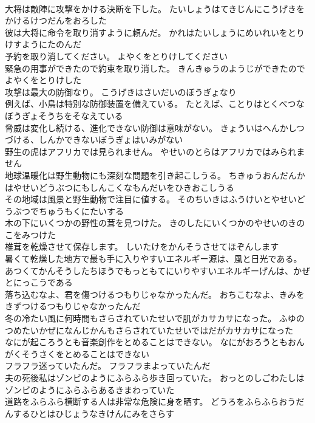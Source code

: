 \documentclass[8pt]{extreport}
\begin{document}
\begin{CJK}{UTF8}{min}
\\	大将は敵陣に攻撃をかける決断を下した。	たいしょうはてきじんにこうげきをかけるけつだんをおろした 
\\	彼は大将に命令を取り消すように頼んだ。	かれはたいしょうにめいれいをとりけすようにたのんだ 
\\	予約を取り消してください。	よやくをとりけしてください 
\\	緊急の用事ができたので約束を取り消した。	きんきゅうのようじができたのでよやくをとりけした 
\\	攻撃は最大の防御なり。	こうげきはさいだいのぼうぎょなり 
\\	例えば、小鳥は特別な防御装置を備えている。	たとえば、ことりはとくべつなぼうぎょそうちをそなえている 
\\	脅威は変化し続ける、進化できない防御は意味がない。	きょういはへんかしつづける、しんかできないぼうぎょはいみがない 
\\	野生の虎はアフリカでは見られません。	やせいのとらはアフリカではみられません 
\\	地球温暖化は野生動物にも深刻な問題を引き起こしうる。	ちきゅうおんだんかはやせいどうぶつにもしんこくなもんだいをひきおこしうる 
\\	その地域は風景と野生動物で注目に値する。	そのちいきはふうけいとやせいどうぶつでちゅうもくにたいする 
\\	木の下にいくつかの野性の茸を見つけた。	きのしたにいくつかのやせいのきのこをみつけた 
\\	椎茸を乾燥させて保存します。	しいたけをかんそうさせてほぞんします 
\\	暑くて乾燥した地方で最も手に入りやすいエネルギー源は、風と日光である。	あつくてかんそうしたちほうでもっともてにいりやすいエネルギーげんは、かぜとにっこうである 
\\	落ち込むなよ、君を傷つけるつもりじゃなかったんだ。	おちこむなよ、きみをきずつけるつもりじゃなかったんだ 
\\	冬の冷たい風に何時間もさらされていたせいで肌がカサカサになった。	ふゆのつめたいかぜになんじかんもさらされていたせいではだがカサカサになった 
\\	なにが起ころうとも音楽創作をとめることはできない。	なにがおろうともおんがくそうさくをとめることはできない 
\\	フラフラ迷っていたんだ。	フラフラまよっていたんだ 
\\	夫の死後私はゾンビのようにふらふら歩き回っていた。	おっとのしごわたしはゾンビのようにふらふらあるきまわっていた 
\\	道路をふらふら横断する人は非常な危険に身を晒す。	どうろをふらふらおうだんするひとはひじょうなきけんにみをさらす 

\end{CJK}
\end{document}
